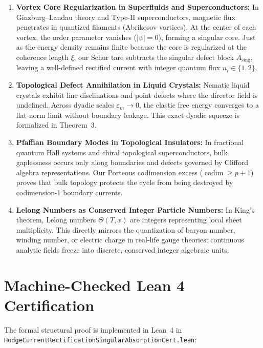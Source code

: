\documentclass[11pt,a4paper]{article}
\theoremstyle{definition}
\begin{document}
\begin{enumerate}
  \item \textbf{Vortex Core Regularization in Superfluids and Superconductors:} In Ginzburg--Landau theory and Type-II superconductors, magnetic flux penetrates in quantized filaments (Abrikosov vortices). At the center of each vortex, the order parameter vanishes ($|\psi| = 0$), forming a singular core. Just as the energy density remains finite because the core is regularized at the coherence length $\xi$, our Schur tare subtracts the singular defect block $A_{\mathrm{sing}}$, leaving a well-defined rectified current with integer quantum flux $n_i \in \{1, 2\}$.
  \item \textbf{Topological Defect Annihilation in Liquid Crystals:} Nematic liquid crystals exhibit line disclinations and point defects where the director field is undefined. Across dyadic scales $\varepsilon_m \to 0$, the elastic free energy converges to a flat-norm limit without boundary leakage. This exact dyadic squeeze is formalized in Theorem~3.
  \item \textbf{Pfaffian Boundary Modes in Topological Insulators:} In fractional quantum Hall systems and chiral topological superconductors, bulk gaplessness occurs only along boundaries and defects governed by Clifford algebra representations. Our Porteous codimension excess ($\operatorname{codim} \ge p+1$) proves that bulk topology protects the cycle from being destroyed by codimension-1 boundary currents.
  \item \textbf{Lelong Numbers as Conserved Integer Particle Numbers:} In King's theorem, Lelong numbers $\Theta(T, x)$ are integers representing local sheet multiplicity. This directly mirrors the quantization of baryon number, winding number, or electric charge in real-life gauge theories: continuous analytic fields freeze into discrete, conserved integer algebraic units.
\end{enumerate}

\section{Machine-Checked Lean 4 Certification}

The formal structural proof is implemented in Lean~4 in \texttt{HodgeCurrentRectificationSingularAbsorptionCert.lean}:
\end{document}
